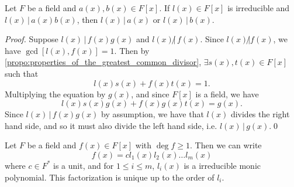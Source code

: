 \begin{propo}
\label{propo:euclid_s_lemma_for_polynomials}
Let $F$ be a field and $a(x), b(x) \in F[x]$. If $l(x) \in F[x]$ is irreducible and $l(x) \, | \, a(x) b(x)$, then $l(x) \, | \, a(x)$ or $l(x) \, | \, b(x)$.
\end{propo}

\begin{proof}
  Suppose $l(x) \, | \, f(x) g(x)$ and $l(x) \not| \, f(x)$. Since $l(x) \not| f(x)$, we have $\gcd[ l(x), f(x) ] = 1$. Then by \cref{propo:properties_of_the_greatest_common_divisor}, $\exists s(x), t(x) \in F[x]$ such that
  \begin{equation*}
    l(x) s(x) + f(x) t(x) = 1.
  \end{equation*}
  Multiplying the equation by $g(x)$, and since $F[x]$ is a field, we have
  \begin{equation*}
    l(x) s(x) g(x) + f(x) g(x) t(x) = g(x).
  \end{equation*}
  Since $l(x) \, | \, f(x) g(x)$ by assumption, we have that $l(x)$ divides the right hand side, and so it must also divide the left hand side, i.e. $l(x) \, | \, g(x)$.\qed
\end{proof}

\begin{thm}
\label{thm:unique_factorization_theorem_for_polynomials}
Let $F$ be a field and $f(x) \in F[x]$ with $\deg f \geq 1$. Then we can write
\begin{equation*}
  f(x) = c l_1(x) l_2(x) \hdots l_m(x)
\end{equation*}
where $c \in F^*$ is a unit, and for $1 \leq i \leq m$, $l_i(x)$ is a irreducible monic polynomial. This factorization is unique up to the order of $l_i$.
\end{thm}

